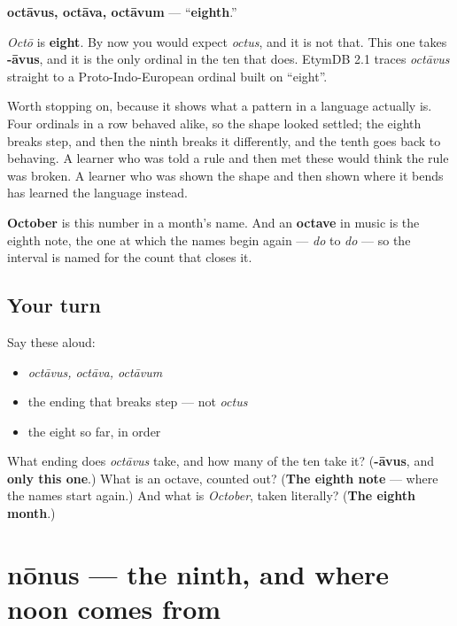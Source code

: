 \begin{cousinweb}
\textbf{octāvus, octāva, octāvum} — \textquotedblleft{}\textbf{eighth}.\textquotedblright{}

\emph{Octō} is \textbf{eight}. By now you would expect \emph{octus}, and it is not that. This one takes \textbf{-āvus}, and it is the only ordinal in the ten that does. EtymDB 2.1 traces \emph{octāvus} straight to a Proto-Indo-European ordinal built on \textquotedblleft{}eight\textquotedblright{}.

Worth stopping on, because it shows what a pattern in a language actually is. Four ordinals in a row behaved alike, so the shape looked settled; the eighth breaks step, and then the ninth breaks it differently, and the tenth goes back to behaving. A learner who was told a rule and then met these would think the rule was broken. A learner who was shown the shape and then shown where it bends has learned the language instead.

\textbf{October} is this number in a month's name. And an \textbf{octave} in music is the eighth note, the one at which the names begin again — \emph{do} to \emph{do} — so the interval is named for the count that closes it.
\end{cousinweb}

\subsection*{Your turn}
Say these aloud:

\begin{itemize}
\raggedright
  \item \emph{octāvus, octāva, octāvum}
  \item the ending that breaks step — not \emph{octus}
  \item the eight so far, in order
\end{itemize}

\begin{tcolorbox}[breakable,colback=teal!4,colframe=teal!35!black,title={Before you move on}]
What ending does \emph{octāvus} take, and how many of the ten take it? (\textbf{-āvus}, and \textbf{only this one}.) What is an octave, counted out? (\textbf{The eighth note} — where the names start again.) And what is \emph{October}, taken literally? (\textbf{The eighth month}.)
\end{tcolorbox}
\section[nōnus, nōna, nōnum]{nōnus — the ninth, and where noon comes from}

